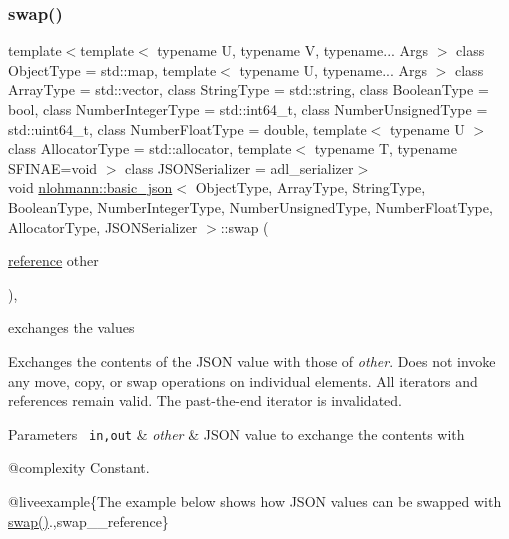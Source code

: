 \subsubsection{\texorpdfstring{swap()}{swap()}\hspace{0.1cm}{\footnotesize\ttfamily [1/4]}}
{\footnotesize\ttfamily template$<$template$<$ typename U, typename V, typename... Args $>$ class Object\+Type = std\+::map, template$<$ typename U, typename... Args $>$ class Array\+Type = std\+::vector, class String\+Type  = std\+::string, class Boolean\+Type  = bool, class Number\+Integer\+Type  = std\+::int64\+\_\+t, class Number\+Unsigned\+Type  = std\+::uint64\+\_\+t, class Number\+Float\+Type  = double, template$<$ typename U $>$ class Allocator\+Type = std\+::allocator, template$<$ typename T, typename S\+F\+I\+N\+A\+E=void $>$ class J\+S\+O\+N\+Serializer = adl\+\_\+serializer$>$ \\
void \mbox{\hyperlink{classnlohmann_1_1basic__json}{nlohmann\+::basic\+\_\+json}}$<$ Object\+Type, Array\+Type, String\+Type, Boolean\+Type, Number\+Integer\+Type, Number\+Unsigned\+Type, Number\+Float\+Type, Allocator\+Type, J\+S\+O\+N\+Serializer $>$\+::swap (\begin{DoxyParamCaption}\item[{\mbox{\hyperlink{classnlohmann_1_1basic__json_ac6a5eddd156c776ac75ff54cfe54a5bc}{reference}}}]{other }\end{DoxyParamCaption})\hspace{0.3cm}{\ttfamily [inline]}, {\ttfamily [noexcept]}}



exchanges the values 

Exchanges the contents of the J\+S\+ON value with those of {\itshape other}. Does not invoke any move, copy, or swap operations on individual elements. All iterators and references remain valid. The past-\/the-\/end iterator is invalidated.


\begin{DoxyParams}[1]{Parameters}
\mbox{\texttt{ in,out}}  & {\em other} & J\+S\+ON value to exchange the contents with\\
\hline
\end{DoxyParams}
@complexity Constant.

@liveexample\{The example below shows how J\+S\+ON values can be swapped with {\ttfamily \mbox{\hyperlink{classnlohmann_1_1basic__json_a8c9d932353e1ab98a7dc2fc27e002031}{swap()}}}.,swap\+\_\+\+\_\+reference\}

